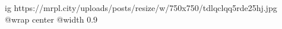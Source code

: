  
 
 
 
 

\ifcmt
  ig https://mrpl.city/uploads/posts/resize/w/750x750/tdlqclqq5rde25hj.jpg
  @wrap center
  @width 0.9
\fi
